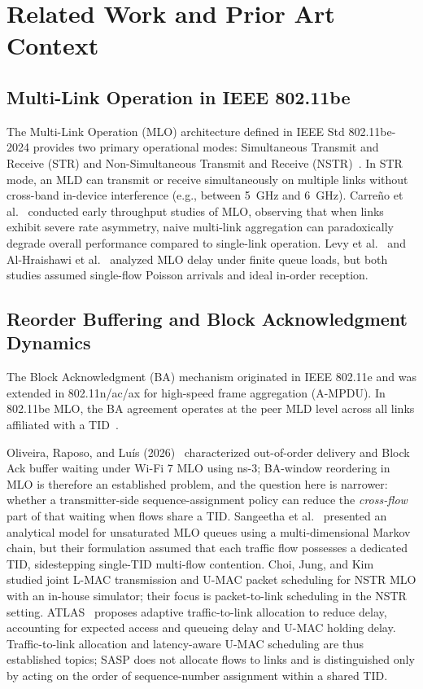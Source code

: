 \documentclass[10pt,journal,compsoc]{IEEEtran}
\begin{document}
\section{Related Work and Prior Art Context}
\label{sec:related}

\subsection{Multi-Link Operation in IEEE 802.11be}
The Multi-Link Operation (MLO) architecture defined in IEEE Std 802.11be-2024 provides two primary operational modes: Simultaneous Transmit and Receive (STR) and Non-Simultaneous Transmit and Receive (NSTR)~\cite{ieee80211be2024}. In STR mode, an MLD can transmit or receive simultaneously on multiple links without cross-band in-device interference (e.g., between 5~GHz and 6~GHz). Carre{\~n}o et al.~\cite{carreno2021multi} conducted early throughput studies of MLO, observing that when links exhibit severe rate asymmetry, naive multi-link aggregation can paradoxically degrade overall performance compared to single-link operation. Levy et al.~\cite{levy2022mlo} and Al-Hraishawi et al.~\cite{alhraishawi2022delay} analyzed MLO delay under finite queue loads, but both studies assumed single-flow Poisson arrivals and ideal in-order reception.

\subsection{Reorder Buffering and Block Acknowledgment Dynamics}
The Block Acknowledgment (BA) mechanism originated in IEEE 802.11e and was extended in 802.11n/ac/ax for high-speed frame aggregation (A-MPDU). In 802.11be MLO, the BA agreement operates at the peer MLD level across all links affiliated with a TID~\cite{ieee80211be2024}. 

Oliveira, Raposo, and Lu{\'{i}}s (2026)~\cite{oliveira2026characterizing} characterized out-of-order delivery and Block Ack buffer waiting under Wi-Fi 7 MLO using ns-3; BA-window reordering in MLO is therefore an established problem, and the question here is narrower: whether a transmitter-side sequence-assignment policy can reduce the \emph{cross-flow} part of that waiting when flows share a TID. Sangeetha et al.~\cite{sangeetha2026performance} presented an analytical model for unsaturated MLO queues using a multi-dimensional Markov chain, but their formulation assumed that each traffic flow possesses a dedicated TID, sidestepping single-TID multi-flow contention. Choi, Jung, and Kim~\cite{choi2025joint} studied joint L-MAC transmission and U-MAC packet scheduling for NSTR MLO with an in-house simulator; their focus is packet-to-link scheduling in the NSTR setting. ATLAS~\cite{atlas2026} proposes adaptive traffic-to-link allocation to reduce delay, accounting for expected access and queueing delay and U-MAC holding delay. Traffic-to-link allocation and latency-aware U-MAC scheduling are thus established topics; SASP does not allocate flows to links and is distinguished only by acting on the order of sequence-number assignment within a shared TID.
\end{document}
